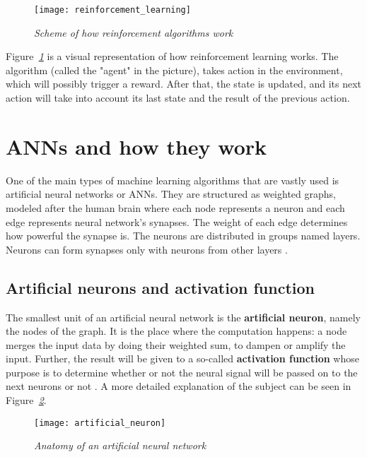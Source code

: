\begin{figure}[h]
  \centering
  \texttt{[image: reinforcement\_learning]}
  \caption{\emph{Scheme of how reinforcement algorithms work \cite{typesMLMedium}}}
  \label{fig:reinforcement_learning}
\end{figure}

Figure\emph{~\ref{fig:reinforcement_learning}} is a visual representation of how reinforcement learning works. The algorithm
(called the "agent" in the picture), takes action in the environment,
which will possibly trigger a reward. After that, the state is updated,
and its next action will take into account its last state and the result of the previous action.

\section{ANNs and how they work}
One of the main types of machine learning algorithms that are vastly used is
artificial neural networks or ANNs.
They are structured as weighted graphs, modeled after the
human brain where each node represents a neuron and each
edge represents neural network's synapses.
The weight of each edge determines how powerful the synapse is.
The neurons are distributed in groups named layers.
Neurons can form synapses only with neurons from other layers \cite{understandingANN}.

\subsection{Artificial neurons and activation function}

The smallest unit of an artificial neural network is the \textbf{artificial neuron},
namely the nodes of the graph. It is the place where the computation happens:
a node merges the input data by doing their weighted sum, to dampen or amplify the input.
Further, the result will be given to a so-called \textbf{activation function} whose purpose is to
determine whether or not the neural signal will be passed on to the next neurons or not \cite{pathMind}.
A more detailed explanation of the subject can be seen in Figure\emph{~\ref{fig:artificial_neuron}}.

\begin{figure}[h]
  \centering
  \texttt{[image: artificial\_neuron]}
  \caption{\emph{Anatomy of an artificial neural network \cite{pathMind}}}
  \label{fig:artificial_neuron}
\end{figure}

